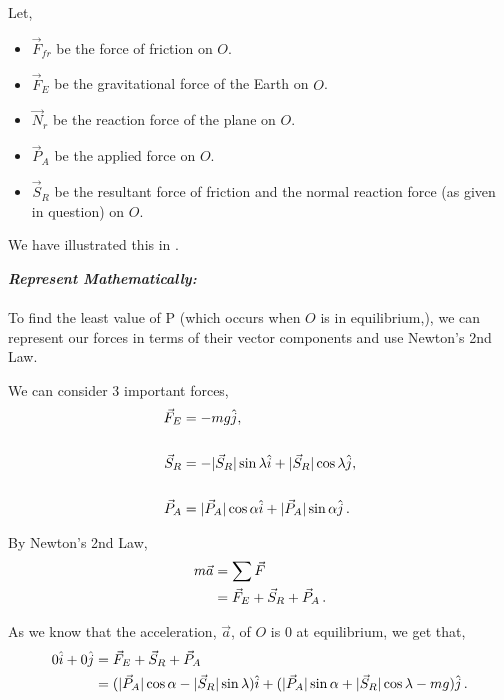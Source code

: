 \begin{subquestions}
\begin{subsubquestions}
	Let, 
	\begin{itemize}
		\item $\vec{F}_{fr}$ be the force of friction on $O$.
		\item $\vec{F}_{E}$ be the gravitational force of the Earth on $O$.
		\item $\vec{N}_{r}$ be the reaction force of the plane on $O$.
		\item $\vec{P}_{A}$ be the applied force on $O$.
		\item $\vec{S}_{R}$ be the resultant force of friction and the normal reaction force (as given in question) on $O$.
	\end{itemize}

	We have illustrated this in .
	
	
	
	\textbf{\textit{Represent Mathematically:}} \\ \\
	To find the least value of P (which occurs when $O$ is in equilibrium,), we can represent our forces in terms of their vector components and use Newton's 2nd Law.
	
	We can consider 3 important forces,
	\begin{align}
		\vec{F}_{E} & = -mg\hat{j} ,\\ \nonumber \\
		\vec{S}_{R} & = -|\vec{S}_{R}|\sin{\lambda}\hat{i} +|\vec{S}_{R}|\cos{\lambda}\hat{j} ,\\ \nonumber \\
		\vec{P}_{A} & = |\vec{P}_{A}|\cos{\alpha}\hat{i} + |\vec{P}_{A}|\sin{\alpha}\hat{j}  \,.
	\end{align}

	By Newton's 2nd Law,
	\begin{align}
		m\vec{a} & = \sum{\vec{F}} \nonumber \\
		         & = \vec{F}_{E} + \vec{S}_{R} + \vec{P}_{A} \,.
	\end{align}

	As we know that the acceleration, $\vec{a}$, of $O$ is 0 at equilibrium, we get that,
	\begin{align}
		0\hat{i} + 0\hat{j} & = \vec{F}_{E} + \vec{S}_{R} + \vec{P}_{A} \nonumber \\
                        & = (|\vec{P}_{A}|\cos{\alpha} - |\vec{S}_{R}|\sin{\lambda})\hat{i} + (|\vec{P}_{A}|\sin{\alpha} + |\vec{S}_{R}|\cos{\lambda} - mg)\hat{j} \,.		
	\end{align}




\end{subsubquestions}
\end{subquestions}
